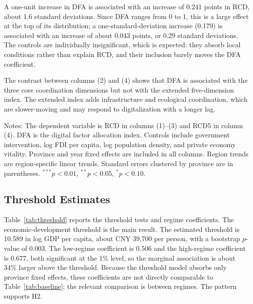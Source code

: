 A one-unit increase in DFA is associated with an increase of 0.241 points in RCD, about 1.6 standard deviations. Since DFA ranges from 0 to 1, this is a large effect at the top of its distribution; a one-standard-deviation increase (0.179) is associated with an increase of about 0.043 points, or 0.29 standard deviations. The controls are individually insignificant, which is expected: they absorb local conditions rather than explain RCD, and their inclusion barely moves the DFA coefficient.

The contrast between columns (2) and (4) shows that DFA is associated with the three core coordination dimensions but not with the extended five-dimension index. The extended index adds infrastructure and ecological coordination, which are slower-moving and may respond to digitalization with a longer lag.

\begin{table}[H]
\caption{Baseline estimates of the effect of DFA on RCD.}\label{tab:baseline}
\begin{threeparttable}
\small

\begin{tablenotes}
\small
\item Notes: The dependent variable is RCD in columns (1)--(3) and RCD5 in column (4). DFA is the digital factor allocation index. Controls include government intervention, log FDI per capita, log population density, and private economy vitality. Province and year fixed effects are included in all columns. Region trends are region-specific linear trends. Standard errors clustered by province are in parentheses. $^{***}p<0.01$, $^{**}p<0.05$, $^{*}p<0.10$.
\end{tablenotes}
\end{threeparttable}
\end{table}

\subsection{Threshold Estimates}\label{sec:threshold}

Table~\ref{tab:threshold} reports the threshold tests and regime coefficients. The economic-development threshold is the main result. The estimated threshold is 10.589 in log GDP per capita, about CNY 39,700 per person, with a bootstrap $p$-value of 0.003. The low-regime coefficient is 0.506 and the high-regime coefficient is 0.677, both significant at the 1\% level, so the marginal association is about 34\% larger above the threshold. Because the threshold model absorbs only province fixed effects, these coefficients are not directly comparable to Table~\ref{tab:baseline}; the relevant comparison is between regimes. The pattern supports H2.

